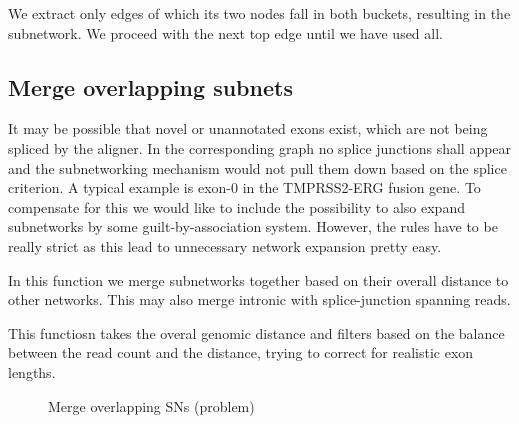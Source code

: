 \documentclass{article}
\theoremstyle{definition}
\begin{document}
We extract only edges of which its two nodes fall in both buckets, resulting in the subnetwork.
We proceed with the next top edge until we have used all.

\clearpage

\subsection{Merge overlapping subnets}
It may be possible that novel or unannotated exons exist, which are not being spliced by the aligner.
In the corresponding graph no splice junctions shall appear and the subnetworking mechanism would not pull them down based on the splice criterion.
A typical example is exon-0 in the TMPRSS2-ERG fusion gene.
To compensate for this we would like to include the possibility to also expand subnetworks by some guilt-by-association system.
However, the rules have to be really strict as this lead to unnecessary network expansion pretty easy.

In this function we merge subnetworks together based on their overall distance to other networks.
This may also merge intronic with splice-junction spanning reads.

This functiosn takes the overal genomic distance and filters based on the balance between the read count and the distance, trying to correct for realistic exon lengths.

\begin{figure}
\begin{center}
\end{center}
\caption{Merge overlapping SNs (problem)}
\label{fig:merge_overlapping_subnets_01}
\end{figure}
\end{document}

